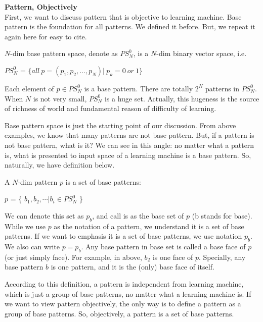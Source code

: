{\bf Pattern, Objectively } \\
First, we want to discuss pattern that is objective to learning machine. Base pattern is the foundation for all patterns. We defined it before. But, we repeat it again here for easy to cite. 


\begin{definition}
$N$-dim base pattern space, denote as $PS^0_N$,  is a $N$-dim binary vector space, i.e.  
\end{definition}
\begin{center}
$PS^0_N$ = $\{ all \  p = (p_1, p_2, \ldots, p_N) | \  p_k = 0 \ or \ 1 \}$ 
\end{center}

Each element of $p \in PS^0_N$ is a base pattern. There are totally $2^N$ patterns in $PS^0_N$. When $N$ is not very small, $PS^0_N$ is a huge set. Actually, this hugeness is the source of richness of world and fundamental reason of difficulty of learning.

Base pattern space is just the starting point of our discussion. From above examples, we know that many patterns are not base pattern. But, if a pattern is not base pattern, what is it? We can see in this angle: no matter what a pattern is, what is presented to input space of a learning machine is a base pattern. So, naturally, we have definition below.


\begin{definition}
A $N$-dim pattern $p$ is a set of base patterns: 
\end{definition}
\begin{center}
$p$ = \{ $b_1, b_2, \cdots | b_i \in  PS^0_N$ \}
\end{center}
We can denote this set as $p_b$, and call is as the base set of $p$ (b stands for base). While we use $p$ as the notation of a pattern, we understand it is a set of base patterns. If we want to emphasis it is a set of base patterns, we use notation $p_b$. We also can write $p = p_b$. Any base pattern in base set is called a base face of $p$ (or just simply face). For example, in above, $b_2$ is one face of $p$. Specially, any base pattern $b$ is one pattern, and it is the (only) base face of itself. 

According to this definition, a pattern is independent from learning machine, which is just a group of base patterns, no matter what a learning machine is. If we want to view pattern objectively, the only way is to define a pattern as a group of base patterns. So, objectively, a pattern is a set of base patterns. 

